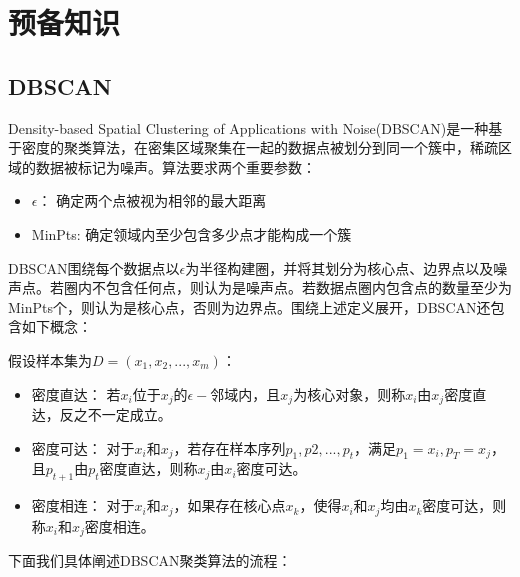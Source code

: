 \section{预备知识}
\label{s4-yubei}
\subsection{DBSCAN}
Density-based Spatial Clustering of Applications with Noise(DBSCAN)是一种基于密度的聚类算法，在密集区域聚集在一起的数据点被划分到同一个簇中，稀疏区域的数据被标记为噪声。算法要求两个重要参数：
\begin{itemize}
	\item $\epsilon$： 确定两个点被视为相邻的最大距离
	\item MinPts: 确定领域内至少包含多少点才能构成一个簇
\end{itemize}

DBSCAN围绕每个数据点以$\epsilon$为半径构建圈，并将其划分为核心点、边界点以及噪声点。若圈内不包含任何点，则认为是噪声点。若数据点圈内包含点的数量至少为MinPts个，则认为是核心点，否则为边界点。围绕上述定义展开，DBSCAN还包含如下概念：

假设样本集为$D=(x_1,x_2,...,x_m)$：
\begin{itemize}
	\item 密度直达： 若$ x_i $位于$ x_j $的$ \epsilon- $邻域内，且$ x_j $为核心对象，则称$ x_i $由$ x_j $密度直达，反之不一定成立。
	\item 密度可达： 对于$ x_i $和$ x_j $，若存在样本序列$ p_1,p2,...,p_t $，满足$ p_1=x_i,p_T=x_j $，且$ p_{t+1} $由$ p_t $密度直达，则称$ x_j $由$ x_i $密度可达。
	\item 密度相连： 对于$ x_i $和$ x_j $，如果存在核心点$ x_k $，使得$ x_i $和$ x_j $均由$ x_k $密度可达，则称$ x_i $和$ x_j $密度相连。
\end{itemize}


下面我们具体阐述DBSCAN聚类算法的流程：


